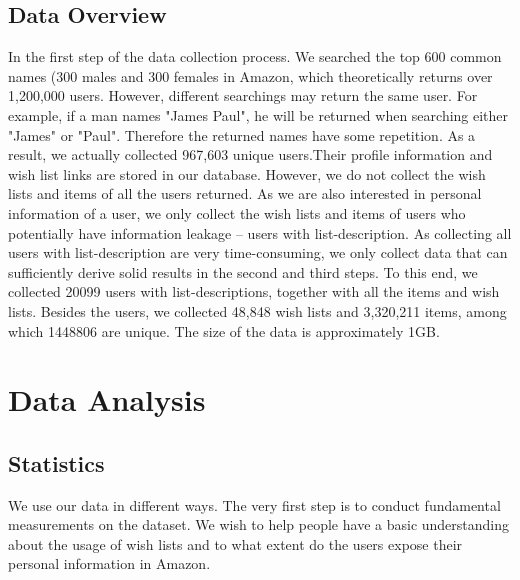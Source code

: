 \documentclass{llncs}
\begin{document}
\subsection{Data Overview}
In the first step of the data collection process. We searched the top 600 common names (300 males \cite{mnames} and 300 females \cite{fnames} in Amazon, which theoretically returns over 1,200,000 users. However, different searchings may return the same user. For example, if a man names "James Paul", he will be returned when searching either "James" or "Paul". Therefore the returned names have some repetition. As a result, we actually collected 967,603 unique users.Their profile information and wish list links are stored in our database. However, we do not collect the wish lists and items of all the users returned. As we are also interested in personal information of a user, we only collect the wish lists and items of users who potentially have information leakage -- users with list-description. As collecting all users with list-description are very time-consuming, we only collect data that can sufficiently derive solid results in the second and third steps. To this end, we collected 20099 users with list-descriptions, together with all the items and wish lists. Besides the users, we collected 48,848 wish lists and 3,320,211 items, among which 1448806 are unique. The size of the data is approximately 1GB. 

\section{Data Analysis}
\subsection{Statistics}
We use our data in different ways. The very first step is to conduct fundamental measurements on the dataset. We wish to help people have a basic understanding about the usage of wish lists and to what extent do the users expose their personal information in Amazon. 
\end{document}
